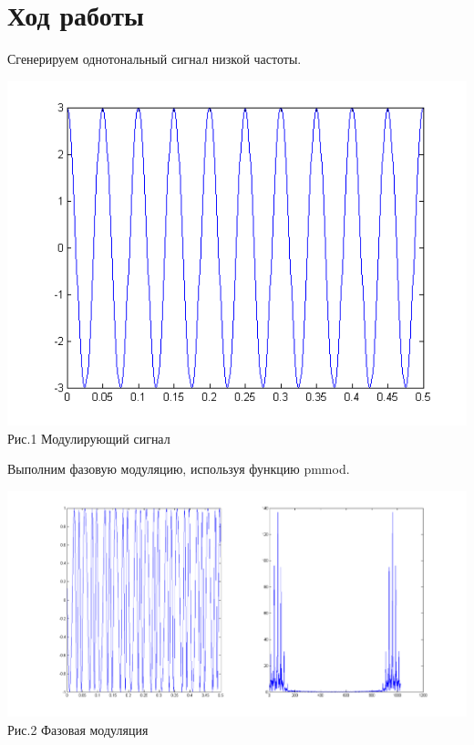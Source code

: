 \documentclass[a4paper]{article}
\begin{document}
\section{Ход работы}
Сгенерируем однотональный сигнал низкой частоты.

\begin{center}
	\includegraphics[scale = 0.7]{sign.png} \\Рис.1 Модулирующий сигнал
\end{center}

Выполним фазовую модуляцию, используя функцию pmmod.

\begin{center}
	\includegraphics[scale = 0.45]{pm.png} \\Рис.2 Фазовая модуляция
\end{center}
\end{document}
